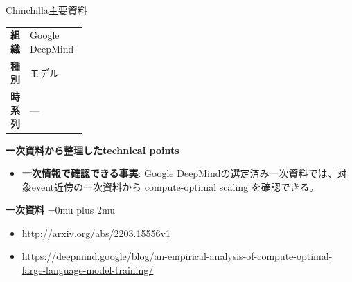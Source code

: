 \begin{technicalnote}{Chinchilla}{主要資料}
\begingroup
\begin{tabularx}{\linewidth}{@{}>{\bfseries}p{0.22\linewidth}X@{}}
組織 & Google DeepMind \\
種別 & モデル \\
時系列 & — \\
\end{tabularx}
\smallskip
{\bfseries 一次資料から整理したtechnical points}
\begin{itemize}[leftmargin=1.5em,itemsep=0.35em]
\item \textbf{一次情報で確認できる事実}: Google DeepMindの選定済み一次資料では、対象event近傍の一次資料から compute-optimal scaling を確認できる。
\end{itemize}
\begin{minipage}{\linewidth}
\begin{samepage}
{\bfseries 一次資料}
\begingroup\sloppy
\Urlmuskip=0mu plus 2mu\relax
\begin{itemize}[leftmargin=1.5em,itemsep=0.25em]
\item {\scriptsize\url{http://arxiv.org/abs/2203.15556v1}}
\item {\scriptsize\url{https://deepmind.google/blog/an-empirical-analysis-of-compute-optimal-large-language-model-training/}}
\end{itemize}
\endgroup
\end{samepage}
\end{minipage}
\endgroup
\end{technicalnote}
\medskip

